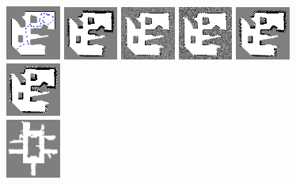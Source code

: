 \documentclass[letterpaper, 10 pt, conference]{ieeeconf} %
\begin{document}
\begin{figure}
  \includegraphics[width=0.16\textwidth]{../../Data/cave_player/gt-final.png}%
  \includegraphics[width=0.16\textwidth]{../../Data/cave_player/TwoAssumptionAlgo.png}%
  \includegraphics[width=0.16\textwidth]{../../Data/cave_player/SICKSlowMetropolis.png}%
  \includegraphics[width=0.16\textwidth]{../../Data/cave_player/SICKDDMCMC.png}%
  \includegraphics[width=0.16\textwidth]{../../Data/cave_player/run_belief_propagation.png}%
  \includegraphics[width=0.16\textwidth]{../../Data/cave_player/dualdecomposition.png}\\
  \includegraphics[width=0.16\textwidth]{../../Data/hospital_player/gt-final.png}%

\end{figure}
\end{document}
